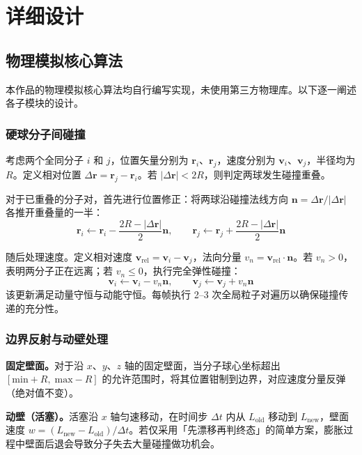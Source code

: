 \documentclass[zihao=-4,a4paper,oneside]{ctexbook}
\newcommand{\chapternb}[1]{%
  \bgroup
  \let\clearpage\relax
  \let\cleardoublepage\relax
  \chapter{#1}%
  \egroup
}
\newcommand{\abs}[1]{\lvert#1\rvert}
\begin{document}
\chapternb{详细设计}

\section{物理模拟核心算法}

本作品的物理模拟核心算法均自行编写实现，未使用第三方物理库。以下逐一阐述各子模块的设计。

\subsection{硬球分子间碰撞}

考虑两个全同分子 $i$ 和 $j$，位置矢量分别为 $\bm{r}_i$、$\bm{r}_j$，速度分别为 $\bm{v}_i$、$\bm{v}_j$，半径均为 $R$。定义相对位置 $\Delta\bm{r}=\bm{r}_j-\bm{r}_i$。若 $\abs{\Delta\bm{r}}<2R$，则判定两球发生碰撞重叠。

对于已重叠的分子对，首先进行位置修正：将两球沿碰撞法线方向 $\bm{n}=\Delta\bm{r}/\abs{\Delta\bm{r}}$ 各推开重叠量的一半：
\begin{equation}
  \bm{r}_i\leftarrow \bm{r}_i-\frac{2R-\abs{\Delta\bm{r}}}{2}\bm{n},\qquad
  \bm{r}_j\leftarrow \bm{r}_j+\frac{2R-\abs{\Delta\bm{r}}}{2}\bm{n}
\end{equation}

随后处理速度。定义相对速度 $\bm{v}_{\text{rel}}=\bm{v}_i-\bm{v}_j$，法向分量 $v_n=\bm{v}_{\text{rel}}\cdot\bm{n}$。若 $v_n>0$，表明两分子正在远离；若 $v_n\leq 0$，执行完全弹性碰撞：
\begin{equation}
  \bm{v}_i\leftarrow \bm{v}_i-v_n\bm{n},\qquad
  \bm{v}_j\leftarrow \bm{v}_j+v_n\bm{n}
\end{equation}
该更新满足动量守恒与动能守恒。每帧执行 2--3 次全局粒子对遍历以确保碰撞传递的充分性。

\subsection{边界反射与动壁处理}

\textbf{固定壁面。}对于沿 $x$、$y$、$z$ 轴的固定壁面，当分子球心坐标超出 $[\text{min}+R,\;\text{max}-R]$ 的允许范围时，将其位置钳制到边界，对应速度分量反弹（绝对值不变）。

\textbf{动壁（活塞）。}活塞沿 $x$ 轴匀速移动，在时间步 $\Delta t$ 内从 $L_{\text{old}}$ 移动到 $L_{\text{new}}$，壁面速度 $w=(L_{\text{new}}-L_{\text{old}})/\Delta t$。若仅采用「先漂移再判终态」的简单方案，膨胀过程中壁面后退会导致分子失去大量碰撞做功机会。
\end{document}
